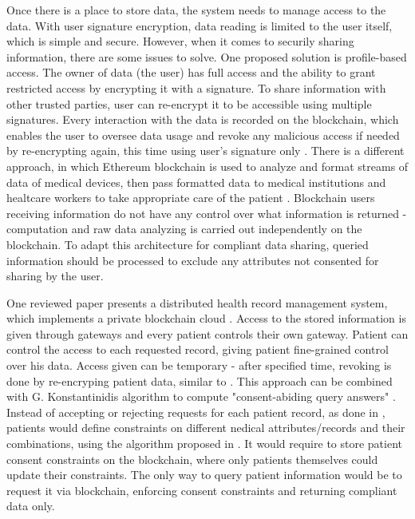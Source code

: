 \documentclass[12pt]{article}
\begin{document}
        Once there is a place to store data, the system needs to manage access to the data. With user signature encryption, data reading is limited to the user itself, which is simple and secure. However, when it comes to securily sharing information, there are some issues to solve. One proposed solution is profile-based access. The owner of data (the user) has full access and the ability to grant restricted access by encrypting it with a signature. To share information with other trusted parties, user can re-encrypt it to be accessible using multiple signatures. Every interaction with the data is recorded on the blockchain, which enables the user to oversee data usage and revoke any malicious access if needed by re-encrypting again, this time using user's signature only \cite{privacy}. There is a different approach, in which Ethereum \cite{ethereum} blockchain is used to analyze and format streams of data of medical devices, then pass formatted data to medical institutions and healtcare workers to take appropriate care of the patient \cite{devices}. Blockchain users receiving information do not have any control over what information is returned - computation and raw data analyzing is carried out independently on the blockchain. To adapt this architecture for compliant data sharing, queried information should be processed to exclude any attributes not consented for sharing by the user.

        One reviewed paper presents a distributed health record management system, which implements a private blockchain cloud \cite{gateways}. Access to the stored information is given through gateways and every patient controls their own gateway. Patient can control the access to each requested record, giving patient fine-grained control over his data. Access given can be temporary - after specified time, revoking is done by re-encryping patient data, similar to \cite{privacy}. This approach can be combined with G. Konstantinidis algorithm to compute "consent-abiding query answers" \cite{konstantinidis}. Instead of accepting or rejecting requests for each patient record, as done in \cite{gateways}, patients would define constraints on different nedical attributes/records and their combinations, using the algorithm proposed in \cite{konstantinidis}. It would require to store patient consent constraints on the blockchain, where only patients themselves could update their constraints. The only way to query patient information would be to request it via blockchain, enforcing consent constraints and returning compliant data only.
\end{document}
